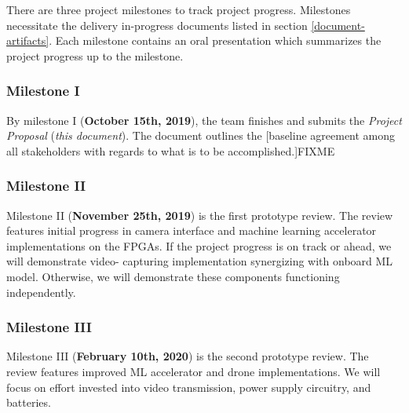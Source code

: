 There are three project milestones to track project progress.
Milestones necessitate the delivery in-progress documents listed
in section \ref{document-artifacts}. Each milestone contains an oral
presentation which summarizes the project progress up to the milestone.

\subsubsection{Milestone I}
By milestone I (\textbf{October 15th, 2019}), the team finishes and submits
the \textit{Project Proposal} (\textit{this document}). The document outlines
the [baseline agreement among all stakeholders with 
regards to what is to be accomplished.]FIXME

\subsubsection{Milestone II}
Milestone II (\textbf{November 25th, 2019}) is the first prototype review. 
The review features initial progress in camera interface
and machine learning accelerator implementations on the FPGAs.
If the project progress is on track or ahead, we will demonstrate video-
capturing implementation synergizing with onboard ML model. Otherwise, we will
demonstrate these components functioning independently.

\subsubsection{Milestone III}
Milestone III (\textbf{February 10th, 2020}) is the second prototype review.
The review features improved ML accelerator and drone implementations. We will
focus on effort invested into video transmission, power supply circuitry, 
and batteries.
